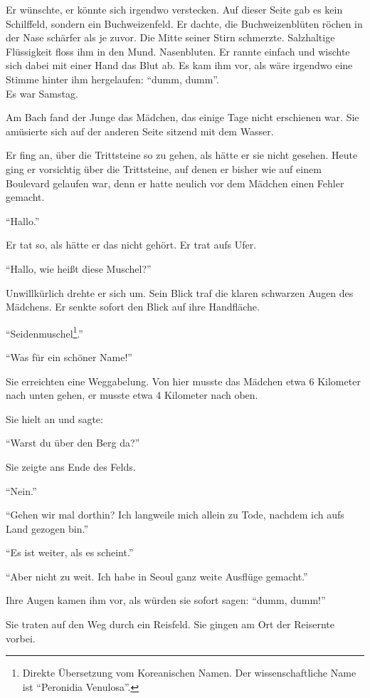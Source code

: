 \documentclass[prd,12pt,tightenlines,notitlepage,nofootinbib]{revtex4-1}
\begin{document}
Er wünschte, er könnte sich irgendwo
verstecken.  Auf dieser Seite gab es kein Schilffeld, sondern ein Buchweizenfeld.
Er dachte, die Buchweizenblüten röchen in der Nase schärfer als je
zuvor.  Die Mitte seiner Stirn schmerzte.  Salzhaltige Flüssigkeit floss ihm
in den Mund.  Nasenbluten.  Er rannte einfach und wischte sich dabei
mit einer Hand das Blut ab.  Es kam ihm vor, als wäre irgendwo eine
Stimme hinter ihm hergelaufen: "`dumm, dumm"'.
\\

Es war Samstag.

Am Bach fand der Junge das Mädchen, das einige
Tage nicht erschienen war.
Sie amüsierte sich auf der anderen Seite sitzend mit dem Wasser.

Er fing an, über die Trittsteine so zu gehen, als hätte er sie
nicht gesehen.  Heute ging er vorsichtig über die Trittsteine, auf denen
er bisher wie auf einem Boulevard gelaufen war, denn er hatte neulich vor dem
Mädchen einen Fehler gemacht.

"`Hallo."'

Er tat so, als hätte er das nicht
gehört.  Er trat aufs Ufer.

"`Hallo, wie heißt diese Muschel?"'

Unwillkürlich drehte er sich um.  Sein Blick traf die klaren schwarzen
Augen des Mädchens.  Er senkte sofort den Blick auf ihre Handfläche.

"`Seidenmuschel\footnote{Direkte Übersetzung vom Koreanischen Namen.
  Der wissenschaftliche Name ist "`Peronidia Venulosa"'.}."'

"`Was für ein schöner Name!"'

Sie erreichten eine Weggabelung.
Von hier musste das Mädchen etwa 6 Kilometer nach unten gehen, er musste
etwa 4 Kilometer nach oben.

Sie hielt an und sagte:

"`Warst du über den Berg da?"'

Sie zeigte ans Ende des Felds.

"`Nein."'

"`Gehen wir mal dorthin?
Ich langweile mich allein zu Tode, nachdem ich aufs Land
gezogen bin."'

"`Es ist weiter, als es scheint."'

"`Aber nicht zu weit.
Ich habe in Seoul ganz weite Ausflüge gemacht."'

Ihre Augen kamen ihm
vor, als würden sie sofort sagen: "`dumm, dumm!"'

Sie traten auf den Weg
durch ein Reisfeld.  Sie gingen am Ort der Reisernte vorbei.
\end{document}
